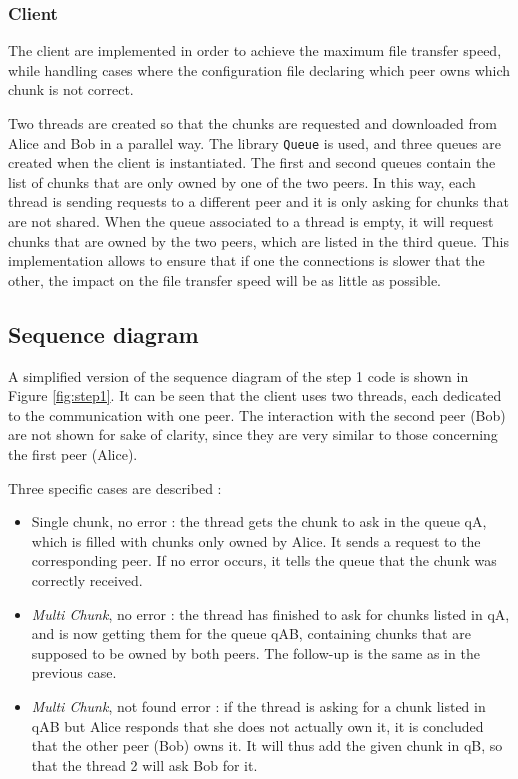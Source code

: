 \subsubsection{Client}

The client are implemented in order to achieve the maximum file transfer speed, while handling cases where the configuration file declaring which peer owns which chunk is not correct.

Two threads are created so that the chunks are requested and downloaded from Alice and Bob in a parallel way. The library \texttt{Queue} is used, and three queues are created when the client is instantiated. The first and second queues contain the list of chunks that are only owned by one of the two peers. In this way, each thread is sending requests to a different peer and it is only asking for chunks that are not shared. When the queue associated to a thread is empty, it will request chunks that are owned by the two peers, which are listed in the third queue. This implementation allows to ensure that if one the connections is slower that the other, the impact on the file transfer speed will be as little as possible.


\subsection{Sequence diagram}

A simplified version of the sequence diagram of the step 1 code is shown in Figure \ref{fig:step1}. It can be seen that the client uses two threads, each dedicated to the communication with one peer. The interaction with the second peer (Bob) are not shown for sake of clarity, since they are very similar to those concerning the first peer (Alice).

Three specific cases are described : 

\begin{itemize}
	\item Single chunk, no error : the thread gets the chunk to ask in the queue qA, which is filled with chunks only owned by Alice. It sends a request to the corresponding peer. If no error occurs, it tells the queue that the chunk was correctly received.
	
	\item \textit{Multi Chunk}, no error : the thread has finished to ask for chunks listed in qA, and is now getting them for the queue qAB, containing chunks that are supposed to be owned by both peers. The follow-up is the same as in the previous case.
	
	\item \textit{Multi Chunk}, not found error : if the thread is asking for a chunk listed in qAB but Alice responds that she does not actually own it, it is concluded that the other peer (Bob) owns it. It will thus add the given chunk in qB, so that the thread 2 will ask Bob for it.
\end{itemize}

